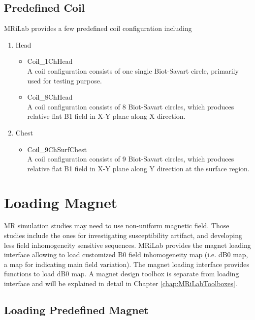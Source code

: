 \documentclass{book}%
\begin{document}
\subsection{Predefined Coil}

MRiLab provides a few predefined coil configuration including

\begin{enumerate}
		\item Head
		\begin{itemize}
			\item Coil\_1ChHead \\
			A coil configuration consists of one single Biot-Savart circle, primarily used for testing purpose.
			\item Coil\_8ChHead \\
			A coil configuration consists of 8 Biot-Savart circles, which produces relative flat B1 field in X-Y plane along X direction.
		\end{itemize}
		
		\item Chest
		\begin{itemize}
			\item Coil\_9ChSurfChest \\
			A coil configuration consists of 9 Biot-Savart circles, which produces relative flat B1 field in X-Y plane along Y direction at the surface region.
		\end{itemize}
\end{enumerate}


\section{Loading Magnet}

MR simulation studies may need to use non-uniform magnetic field. Those studies include the ones for investigating susceptibility artifact, and developing less field inhomogeneity sensitive sequences. MRiLab provides the magnet loading interface allowing to load customized B0 field inhomogeneity map (i.e. dB0 map, a map for indicating main field variation). The magnet loading interface provides functions to load dB0 map. A magnet design toolbox is separate from loading interface and will be explained in detail in Chapter \ref{chap:MRiLabToolboxes}.

\subsection{Loading Predefined Magnet}
\end{document}
